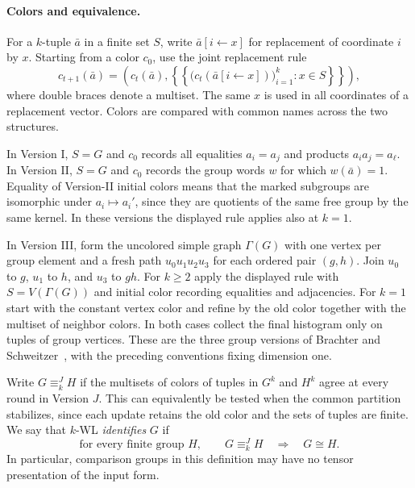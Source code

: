 \documentclass[11pt]{article}
\theoremstyle{definition}
\theoremstyle{remark}
\numberwithin{equation}{section}
\begin{document}
\paragraph{Colors and equivalence.}
For a $k$-tuple $\bar a$ in a finite set $S$, write
$\bar a[i\leftarrow x]$ for replacement of coordinate $i$ by $x$.
Starting from a color $c_0$, use the joint replacement rule
\[
 c_{t+1}(\bar a)=\left(c_t(\bar a), \left\{\!\!\left\{
 \big(c_t(\bar a[i\leftarrow x])\big)_{i=1}^k : x\in S
 \right\}\!\!\right\}\right),
\]
where double braces denote a multiset. The same $x$ is used in all
coordinates of a replacement vector. Colors are compared with common
names across the two structures.

In Version I, $S=G$ and $c_0$ records all equalities $a_i=a_j$ and
products $a_i a_j=a_\ell$. In Version II, $S=G$ and $c_0$ records the
group words $w$ for which $w(\bar a)=1$. Equality of Version-II initial
colors means that the marked subgroups are isomorphic under $a_i\mapsto
a_i'$, since they are quotients of the same free group by the same kernel.
In these versions the displayed rule applies also at $k=1$.

In Version III, form the uncolored simple graph $\Gamma(G)$ with one
vertex per group element and a fresh path $u_0u_1u_2u_3$ for each
ordered pair $(g,h)$. Join $u_0$ to $g$, $u_1$ to $h$, and $u_3$ to
$gh$. For $k\ge2$ apply the displayed rule with $S=V(\Gamma(G))$
and initial color recording equalities and adjacencies. For $k=1$ start
with the constant vertex color and refine by the old color together with
the multiset of neighbor colors. In both cases collect the final
histogram only on tuples of group vertices. These are the three group
versions of Brachter and Schweitzer~\cite{BS2020}, with the preceding
conventions fixing dimension one.

Write $G\equiv_k^J H$ if the multisets of colors of tuples in $G^k$ and
$H^k$ agree at every round in Version $J$. This can equivalently be
tested when the common partition stabilizes, since each update retains
the old color and the sets of tuples are finite. We say that $k$-WL
\emph{identifies} $G$ if
\begin{equation}
 \text{for every finite group }H,\qquad
 G\equiv_k^J H\quad\Longrightarrow\quad G\cong H .
 \label{eq:identifies}
\end{equation}
In particular, comparison groups in this definition may have no tensor
presentation of the input form.
\end{document}
